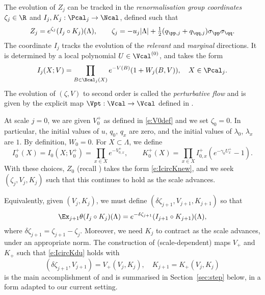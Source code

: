 The evolution of $Z_j$ can be tracked in the \emph{renormalisation group coordinates}
$\zeta_j \in \R$ and
$I_j, K_j : \Pcal_j \to \Ncal$, defined such that
\begin{equation}
\label{e:IcircKnew}
	Z_j = e^{\zeta_j}(I_j\circ K_j)(\Lambda),
	\qquad
	\zeta_j= - u_j|\Lambda|
	+ \textstyle{\frac 12} (q_{\pp,j} + q_{\qq,j}) \sigma_\pp\sigma_\qq
	.
\end{equation}
The coordinate $I_j$ tracks the evolution of the
\emph{relevant} and \emph{marginal} directions.  It
is determined by a local polynomial
$U\in \Vcal^{(0)}$,
and takes the form
\begin{equation}
I_j(X; V)
	=
\prod_{B \in \Bcal_j(X)} e^{-V(B)} (1 + W_j(B, V)), \quad X \in \Pcal_j.
\end{equation}
The evolution of $(\zeta, V)$ to second order is called the \emph{perturbative flow} and is
given by the explicit map $\Vpt : \Vcal \to \Vcal$ defined in
\cite[\eqref{pt-e:Vptdef}]{BBS-rg-pt}.

At scale $j = 0$, we are given $V^+_0$ as defined in \eqref{e:V0def}
and we set $\zeta_0 = 0$. In particular,
the initial values of $u$, $q_0$, $q_x$ are zero, and the initial values of $\lambda_0$, $\lambda_x$
are $1$. By definition, $W_0 = 0$.
For $X \subset \Lambda$, we define
\begin{equation}
\label{e:IK0def}
I_0^+(X) = I_0(X; V^+_0) = \prod_{x\in X} e^{-V^+_{0,x}},
	\qquad
K_0^+(X) = \prod_{x \in X} I_{0,x}^+ (e^{-\gamma_0 U^{+}_{x}} - 1).
\end{equation}
With these choices, $Z_0$ (recall )
takes the form \eqref{e:IcircKnew}, and we seek $(\zeta_j, V_j, K_j)$ such that
this continues to hold as the scale advances.

Equivalently, given $(V_j, K_j)$, we must define $(\delta\zeta_{j+1}, V_{j+1}, K_{j+1})$ so that
\begin{equation} \label{e:IcircKdu}
	\Ex_{j+1}\theta(I_j \circ K_j)(\Lambda)
	=
	e^{-\delta \zeta_{j+1}}(I_{j+1} \circ K_{j+1})(\Lambda),
\end{equation}
where $\delta\zeta_{j+1} = \zeta_{j+1} - \zeta_j$.
Moreover, we need $K_j$ to contract as the scale advances, under an appropriate norm.
The construction of (scale-dependent) maps $V_+$ and $K_+$ such that
\eqref{e:IcircKdu} holds with
\begin{equation}
(\delta\zeta_{j+1}, V_{j+1}) = V_+(V_j, K_j),
	\quad
K_{j+1} =  K_+(V_j, K_j)
\end{equation}
is the main accomplishment of \cite{BS-rg-step} and is summarised in Section~\ref{sec:step}
below, in a form adapted to our current setting.

